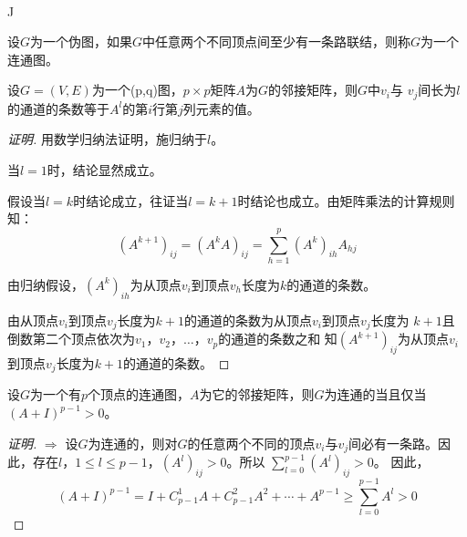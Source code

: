 \documentclass{beamer}
\begin{document}
\begin{CJK*}{UTF8}{gbsn}
\begin{frame}
\begin{minipage}{0.25\linewidth}
\\
 \vspace*{0.3cm}
 J
\end{minipage}
\begin{minipage}{0.75\linewidth}
    \begin{Def}
   设$G$为一个伪图，如果$G$中任意两个不同顶点间至少有一条路联结，则称$G$为一个连通图。
 \end{Def}
\end{minipage}
\end{frame}

\begin{frame}
    \begin{Thm1}
    设$G=(V,E)$为一个(p,q)图，$p\times p$矩阵$A$为$G$的邻接矩阵，则$G$中$v_i$与
    $v_j$间长为$l$的通道的条数等于$A^l$的第$i$行第$j$列元素的值。
  \end{Thm1}
  \begin{proof}[证明]
      用数学归纳法证明，施归纳于$l$。

  当$l=1$时，结论显然成立。

  假设当$l=k$时结论成立，往证当$l=k+1$时结论也成立。由矩阵乘法的计算规则知：
  \[(A^{k+1})_{ij} = (A^{k}A)_{ij} = \sum_{h=1}^p(A^k)_{ih}A_{hj}\]

  由归纳假设，$(A^k)_{ih}$为从顶点$v_i$到顶点$v_h$长度为$k$的通道的条数。

  由从顶点$v_i$到顶点$v_j$长度为$k+1$的通道的条数为从顶点$v_i$到顶点$v_j$长度为
  $k+1$且倒数第二个顶点依次为$v_1$，$v_2$，$\ldots$，$v_p$的通道的条数之和
  知$(A^{k+1})_{ij}$为从顶点$v_i$到顶点$v_j$长度为$k+1$的通道的条数。
  \end{proof}
\end{frame}

\begin{frame}
\begin{Thm}
  设$G$为一个有$p$个顶点的连通图，$A$为它的邻接矩阵，则$G$为连通的当且仅当$(A+I)^{p-1}>0$。
\end{Thm}
\begin{proof}[证明]
  $\Rightarrow$ 设$G$为连通的，则对$G$的任意两个不同的顶点$v_i$与$v_j$间必有一条路。因此，存在$l$，$1\leq l \leq p-1$，$(A^l)_{ij}>0$。所以
  $\sum_{l=0}^{p-1}(A^l)_{ij}>0$。
  因此，\[(A+I)^{p-1}=I + C_{p-1}^{1}A + C_{p-1}^{2}A^2 + \cdots + A^{p-1} \geq \sum_{l=0}^{p-1}A^l > 0\]


\end{proof}
\end{frame}
\end{CJK*}
\end{document}

